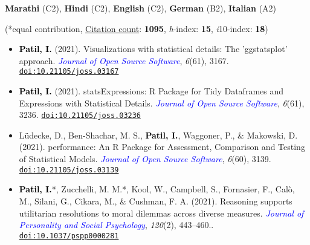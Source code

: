 \documentclass[10pt]{article}
\begin{document}
	\textbf{Marathi} (C2), \textbf{Hindi} (C2), \textbf{English} (C2), \textbf{German} (B2), \textbf{Italian} (A2)
	

	\begin{center}
	(*equal contribution, \href{https://scholar.google.it/citations?user=kSYuYTUAAAAJ&hl=en&oi=ao}{Citation count}: \textbf{\textcolor{black}{1095}}, \textit{h}-index: \textbf{\textcolor{black}{15}}, \textit{i}10-index: \textbf{\textcolor{black}{18}})
	\end{center}
	
	\begin{itemize}

%

	\item \textbf{\textcolor{black}{Patil, I.}} (2021). Visualizations with statistical details: The 'ggstatsplot' approach. \textit{\textcolor{blue}{Journal of Open Source Software}}, \textit{6}(61), 3167. \href{https://joss.theoj.org/papers/10.21105/joss.03167}{\tt doi:10.21105/joss.03167}

	\item \textbf{\textcolor{black}{Patil, I.}} (2021). statsExpressions: R Package for Tidy Dataframes and Expressions with Statistical Details. \textit{\textcolor{blue}{Journal of Open Source Software}}, \textit{6}(61), 3236. \href{https://joss.theoj.org/papers/10.21105/joss.03236}{\tt doi:10.21105/joss.03236}

	\item Lüdecke, D., Ben-Shachar,  M. S., \textbf{\textcolor{black}{Patil, I.}}, Waggoner, P., \& Makowski, D. (2021). performance: An R Package for Assessment, Comparison and Testing of Statistical Models. \textit{\textcolor{blue}{Journal of Open Source Software}}, \textit{6}(60), 3139. \href{https://joss.theoj.org/papers/10.21105/joss.03139}{\tt doi:10.21105/joss.03139}
	
	\item \textbf{\textcolor{black}{Patil, I.}}*, Zucchelli, M. M.*, Kool, W., Campbell, S., Fornasier, F., Cal\`{o}, M., Silani, G., Cikara, M., \& Cushman, F. A. (2021). Reasoning supports utilitarian resolutions to moral dilemmas across diverse measures. \textit{\textcolor{blue}{Journal of Personality and Social Psychology}}, \textit{120}(2), 443–460.. \href{https://www.researchgate.net/publication/338496843_Reasoning_supports_utilitarian_resolutions_to_moral_dilemmas_across_diverse_measures}{\tt doi:10.1037/pspp0000281}
	

\end{itemize}
\end{document}
